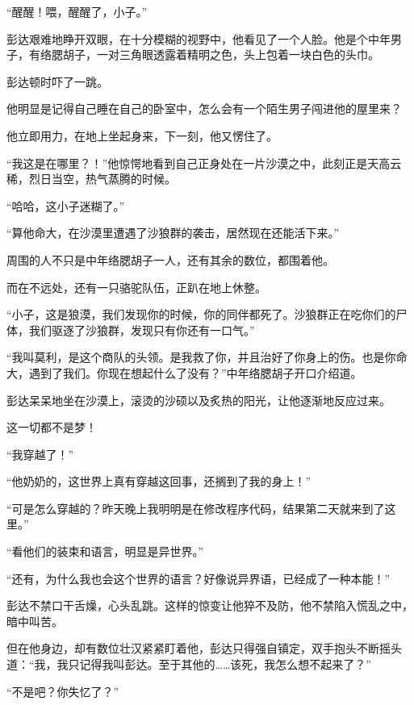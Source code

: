 
\begin{this_body}



“醒醒！喂，醒醒了，小子。”

彭达艰难地睁开双眼，在十分模糊的视野中，他看见了一个人脸。他是个中年男子，有络腮胡子，一对三角眼透露着精明之色，头上包着一块白色的头巾。

彭达顿时吓了一跳。

他明显是记得自己睡在自己的卧室中，怎么会有一个陌生男子闯进他的屋里来？

他立即用力，在地上坐起身来，下一刻，他又愣住了。

“我这是在哪里？！”他惊愕地看到自己正身处在一片沙漠之中，此刻正是天高云稀，烈日当空，热气蒸腾的时候。

“哈哈，这小子迷糊了。”

“算他命大，在沙漠里遭遇了沙狼群的袭击，居然现在还能活下来。”

周围的人不只是中年络腮胡子一人，还有其余的数位，都围着他。

而在不远处，还有一只骆驼队伍，正趴在地上休整。

“小子，这是狼漠，我们发现你的时候，你的同伴都死了。沙狼群正在吃你们的尸体，我们驱逐了沙狼群，发现只有你还有一口气。”

“我叫莫利，是这个商队的头领。是我救了你，并且治好了你身上的伤。也是你命大，遇到了我们。你现在想起什么了没有？”中年络腮胡子开口介绍道。

彭达呆呆地坐在沙漠上，滚烫的沙硕以及炙热的阳光，让他逐渐地反应过来。

这一切都不是梦！

“我穿越了！”

“他奶奶的，这世界上真有穿越这回事，还搁到了我的身上！”

“可是怎么穿越的？昨天晚上我明明是在修改程序代码，结果第二天就来到了这里。”

“看他们的装束和语言，明显是异世界。”

“还有，为什么我也会这个世界的语言？好像说异界语，已经成了一种本能！”

彭达不禁口干舌燥，心头乱跳。这样的惊变让他猝不及防，他不禁陷入慌乱之中，暗中叫苦。

但在他身边，却有数位壮汉紧紧盯着他，彭达只得强自镇定，双手抱头不断摇头道：“我，我只记得我叫彭达。至于其他的……该死，我怎么想不起来了？”

“不是吧？你失忆了？”


\end{this_body}
